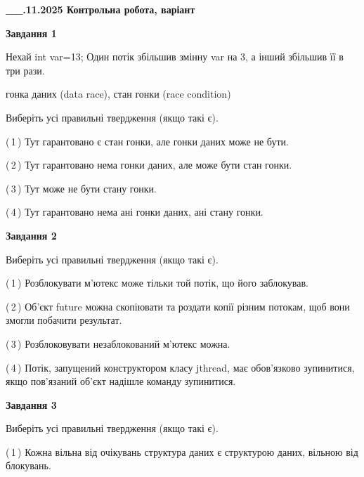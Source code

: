 \documentclass[12pt, ukrainian]{article}
\begin{document}
\begin {large}



\textbf{\_\_.11.2025 Контрольна робота, варіант  }\par


{

\begin{center}
\textbf{Завдання 1}
\end{center}
Нехай int var=13; Один потік збільшив змінну var на 3, а інший збільшив її в три рази.

гонка даних (data race), стан гонки (race condition)

Виберіть усі правильні твердження (якщо такі є).\par
\vspace{2mm}
(\,1\,) Тут гарантовано є стан гонки, але гонки даних може не бути.%

(\,2\,) Тут гарантовано нема гонки даних, але може бути стан гонки.%

(\,3\,) Тут може не бути стану гонки.%

(\,4\,) Тут гарантовано нема ані гонки даних, ані стану гонки.%



\begin{center}
\textbf{Завдання 2}
\end{center}
Виберіть усі правильні твердження (якщо такі є).\par
\vspace{2mm}

(\,1\,) Розблокувати м’ютекс може тільки той потік, що його заблокував.%

(\,2\,) Об’єкт future можна скопіювати та роздати копії різним потокам, щоб вони змогли побачити результат.%

(\,3\,) Розблоковувати незаблокований м’ютекс можна.%

(\,4\,) Потік, запущений конструктором класу jthread, має обов’язково зупинитися, якщо пов’язаний об’єкт надішле команду зупинитися.%



\begin{center}
\textbf{Завдання 3}
\end{center}
Виберіть усі правильні твердження (якщо такі є).\par
\vspace{2mm}

(\,1\,) Кожна вільна від очікувань структура даних є структурою даних, вільною від блокувань.%

}
\end{large}
\end{document}
